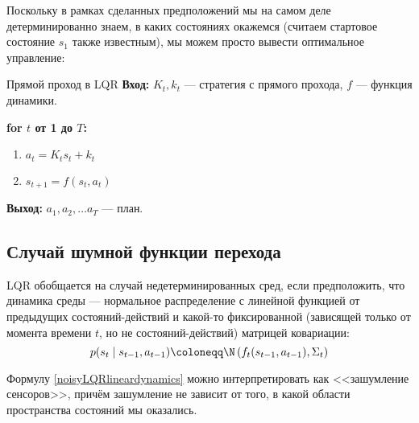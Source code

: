 Поскольку в рамках сделанных предположений мы на самом деле детерминированно знаем, в каких состояниях окажемся (считаем стартовое состояние $s_1$ также известным), мы можем просто вывести оптимальное управление:
\begin{algorithm}{Прямой проход в LQR}
\textbf{Вход:} $K_t, k_t$ --- стратегия с прямого прохода, $f$ --- функция динамики.

\vspace{0.3cm}
\textbf{for $t$ от 1 до $T$:}
\begin{enumerate}
    \item $a_t = K_t s_t + k_t$
    \item $s_{t+1} = f(s_t, a_t)$
\end{enumerate}

\vspace{0.3cm}
\textbf{Выход:} $a_1, a_2, \dots a_T$ --- план.
\end{algorithm}

\subsection{Случай шумной функции перехода}

LQR обобщается на случай недетерминированных сред, если предположить, что динамика среды --- нормальное распределение с линейной функцией от предыдущих состояний-действий и какой-то фиксированной (зависящей только от момента времени $t$, но не состояний-действий) матрицей ковариации:
\begin{equation}\label{noisyLQRlineardynamics}
p(s_{t} \mid s_{t-1}, a_{t-1}) \coloneqq \N \left( f_t(s_{t-1}, a_{t-1}), \Sigma_t \right) 
\end{equation}

Формулу \eqref{noisyLQRlineardynamics} можно интерпретировать как <<зашумление сенсоров>>, причём зашумление не зависит от того, в какой области пространства состояний мы оказались.


